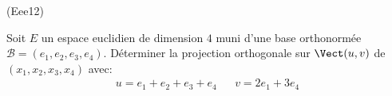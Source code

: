\begin{tiny}(Eee12)\end{tiny} Soit $E$ un espace euclidien de dimension $4$ muni d'une base orthonormée $\mathcal{B}=(e_1,e_2,e_3,e_4)$. Déterminer la projection orthogonale sur $\Vect(u,v)$ de $(x_1,x_2,x_3,x_4)$ avec:
\begin{align*}
 u = e_1 + e_2 + e_3 + e_4 & &
 v = 2e_1 + 3e_4
\end{align*}
 